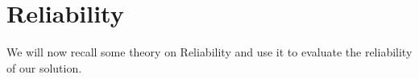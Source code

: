 \section{Reliability}
We will now recall some theory on Reliability and use it to evaluate the reliability of our solution.
